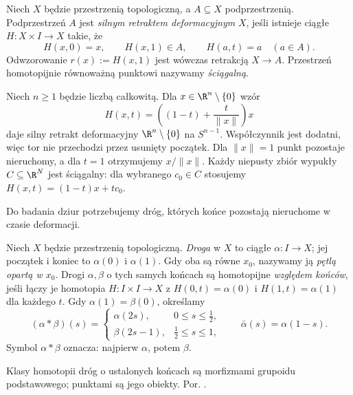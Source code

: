 \begin{definicja}
\label{def:retrakt-deformacyjny}
Niech $X$ będzie przestrzenią topologiczną,
a $A\subseteq X$ podprzestrzenią.
Podprzestrzeń $A$ jest
\emph{silnym retraktem deformacyjnym} $X$,
jeśli istnieje ciągłe $H:X\times I\to X$ takie, że
\[
 H(x,0)=x,\qquad H(x,1)\in A,\qquad
 H(a,t)=a\quad(a\in A).
\]
Odwzorowanie $r(x):=H(x,1)$ jest wówczas
retrakcją $X\to A$. Przestrzeń homotopijnie
równoważną punktowi nazywamy \emph{ściągalną}.
\end{definicja}

\begin{przyklad}
\label{prz:retrakcja-pierscien}
Niech $n\geq1$ będzie liczbą całkowitą.
Dla $x\in\R^n\setminus\{0\}$ wzór
\[
 H(x,t)=\left((1-t)+\frac{t}{\|x\|}\right)x
\]
daje silny retrakt deformacyjny
$\R^n\setminus\{0\}$ na $S^{n-1}$.
Współczynnik jest dodatni, więc tor
nie przechodzi przez usunięty początek.
Dla $\|x\|=1$ punkt pozostaje nieruchomy,
a dla $t=1$ otrzymujemy $x/\|x\|$.
Każdy niepusty zbiór wypukły $C\subseteq\R^N$ jest ściągalny:
dla wybranego $c_0\in C$ stosujemy
$H(x,t)=(1-t)x+tc_0$.
\end{przyklad}

Do badania dziur potrzebujemy dróg,
których końce pozostają nieruchome w czasie deformacji.

\begin{definicja}
\label{def:droga-petla}
Niech $X$ będzie przestrzenią topologiczną.
\emph{Droga} w $X$ to ciągłe
$\alpha:I\to X$; jej początek i koniec
to $\alpha(0)$ i $\alpha(1)$.
Gdy oba są równe $x_0$, nazywamy ją
\emph{pętlą opartą w $x_0$}.
Drogi $\alpha,\beta$ o tych samych końcach
są homotopijne \emph{względem końców},
jeśli łączy je homotopia $H:I\times I\to X$
z $H(0,t)=\alpha(0)$ i
$H(1,t)=\alpha(1)$ dla każdego $t$.
Gdy $\alpha(1)=\beta(0)$, określamy
\[
 (\alpha*\beta)(s)=
 \begin{cases}
  \alpha(2s),&0\leq s\leq\tfrac12,\\
  \beta(2s-1),&\tfrac12\leq s\leq1,
 \end{cases}
 \qquad \bar\alpha(s)=\alpha(1-s).
\]
Symbol $\alpha*\beta$ oznacza: najpierw $\alpha$,
potem $\beta$.
\end{definicja}

Klasy homotopii dróg o ustalonych końcach są morfizmami grupoidu podstawowego; punktami są jego obiekty. Por. .

